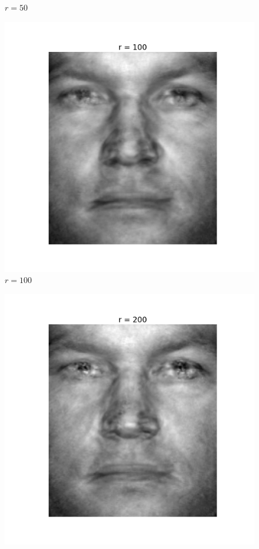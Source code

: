 \begin{enumerate}[label=\arabic*.]
\begin{mdframed}[style=MyFrame]
\begin{figure}[H]
                    \caption{$r=50$}
                \end{figure}
                \begin{figure}[H]
                    \includegraphics[height=0.35\textheight]{../media/r-100-1.png}
                    \caption{$r=100$}
                \end{figure}
                \begin{figure}[H]
                    \includegraphics[height=0.35\textheight]{../media/r-200-1.png}

\end{figure}
\end{mdframed}
\end{enumerate}
